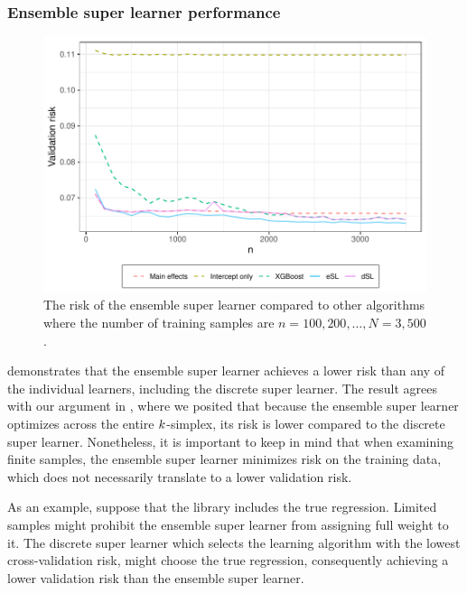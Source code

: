 \documentclass[./main.tex]{subfiles}
\begin{document}
\subsubsection{Ensemble super learner performance}
\begin{figure}[H]
    \centering
    \includegraphics[width=\textwidth]{figures/losses_esl_s22.pdf}
    \caption{The risk of the ensemble super learner compared to other algorithms where the number of training samples are $n = 100, 200, \dots , N = 3,500 $.}
    \label{fig:losses_esl_s22}
\end{figure}
 demonstrates that the ensemble super learner achieves a lower risk than any of the individual learners, including the discrete super learner. The result agrees with our argument in , where we posited that because the ensemble super learner optimizes across the entire $ k $-simplex, its risk is lower compared to the discrete super learner. Nonetheless, it is important to keep in mind that when examining finite samples, the ensemble super learner minimizes risk on the training data, which does not necessarily translate to a lower validation risk. 

As an example, suppose that the library includes the true regression. Limited samples might prohibit the ensemble super learner from assigning full weight to it. The discrete super learner which selects the learning algorithm with the lowest cross-validation risk, might choose the true regression, consequently achieving a lower validation risk than the ensemble super learner.
\end{document}
